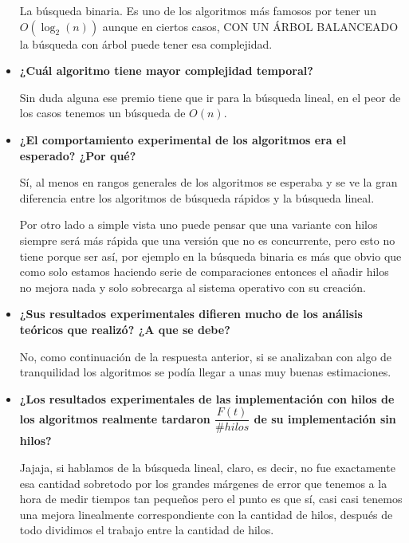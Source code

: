 \documentclass[12pt, fleqn]{article}                             %
\theoremstyle{break}                                            %
\begin{document}
\begin{itemize}
                La búsqueda binaria. Es uno de los algoritmos más famosos por tener un $O(\log_2(n))$
                aunque en ciertos casos, CON UN ÁRBOL BALANCEADO la búsqueda con árbol puede tener esa
                complejidad.

            \clearpage

            \item
                \textbf{¿Cuál algoritmo tiene mayor complejidad temporal?}

                Sin duda alguna ese premio tiene que ir para la búsqueda lineal, en el peor de los casos
                tenemos un búsqueda de $O(n)$.
            \item
                \textbf{¿El comportamiento experimental de los algoritmos era el esperado? ¿Por qué?}

                Sí, al menos en rangos generales de los algoritmos se esperaba y se ve la gran diferencia entre
                los algoritmos de búsqueda rápidos y la búsqueda lineal.

                Por otro lado a simple vista uno puede pensar que una variante con hilos siempre será más rápida
                que una versión que no es concurrente, pero esto no tiene porque ser así, por ejemplo
                en la búsqueda binaria es más que obvio que como solo estamos haciendo serie de comparaciones
                entonces el añadir hilos no mejora nada y solo sobrecarga al sistema operativo con su creación.

            \item
                \textbf{¿Sus resultados experimentales difieren mucho de los análisis teóricos
                    que realizó? ¿A que se debe?}

                No, como continuación de la respuesta anterior, si se analizaban con algo de tranquilidad
                los algoritmos se podía llegar a unas muy buenas estimaciones.

            \item
                \textbf{¿Los resultados experimentales de las implementación con hilos de los
                algoritmos realmente tardaron $\dfrac{F(t)}{\#hilos}$ de su implementación sin hilos?}

                Jajaja, si hablamos de la búsqueda lineal, claro, es decir, no fue exactamente esa cantidad
                sobretodo por los grandes márgenes de error que tenemos a la hora de medir tiempos
                tan pequeños pero el punto es que sí, casi casi tenemos una mejora linealmente correspondiente
                con la cantidad de hilos, después de todo dividimos el trabajo entre la cantidad de hilos.


\end{itemize}
\end{document}
